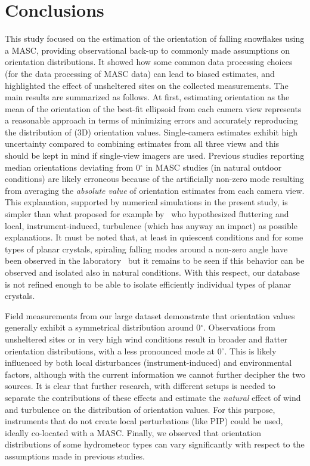 \documentclass[draft]{agujournal2019}
\begin{document}
\section{Conclusions}
This study focused on the estimation of the orientation of falling snowflakes using a MASC, providing observational back-up to commonly made assumptions on orientation distributions. It showed how some common data processing choices (for the data processing of MASC data) can lead to biased estimates, and highlighted the effect of unsheltered sites on the collected measurements.
The main results are summarized as follows. 
At first, estimating orientation as the mean of the orientation of the best-fit ellipsoid from each camera view represents a reasonable approach in terms of minimizing errors and accurately reproducing the distribution of (3D) orientation values. Single-camera estimates exhibit high uncertainty compared to combining estimates from all three views and this should be kept in mind if single-view imagers are used. Previous studies reporting median orientations deviating from 0$^\circ$ in MASC studies (in natural outdoor conditions) are likely erroneous because of the artificially non-zero mode resulting from averaging the \textit{absolute value} of orientation estimates from each camera view. This explanation, supported by numerical simulations in the present study, is simpler than what proposed for example by~\cite{Garrett_GRL_2015} who hypothesized fluttering and local, instrument-induced, turbulence (which has anyway an impact) as possible explanations. It must be noted that, at least in quiescent conditions and for some types of planar crystals, spiraling falling modes around a non-zero angle have been observed in the laboratory~\cite{Stout_ACP_2024} but it remains to be seen if this behavior can be observed and isolated also in natural conditions. With this respect, our database is not refined enough to be able to isolate efficiently individual types of planar crystals. 

Field measurements from our large dataset demonstrate that orientation values generally exhibit a symmetrical distribution around 0$^\circ$. Observations from unsheltered sites or in very high wind conditions result in broader and flatter orientation distributions, with a less pronounced mode at 0$^\circ$. This is likely influenced by both local disturbances (instrument-induced) and environmental factors, although with the current information we cannot further decipher the two sources.
It is clear that further research, with different setups is needed to separate the contributions of these effects and estimate the \textit{natural} effect of wind and turbulence on the distribution of orientation values. For this purpose, instruments that do not create local perturbations (like PIP) could be used, ideally co-located with a MASC.   Finally, we observed that orientation distributions of some hydrometeor types can vary significantly with respect to the assumptions made in previous studies.
\end{document}
